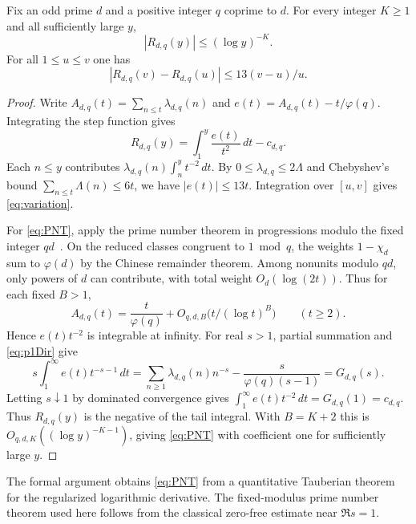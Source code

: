 \begin{lemma}\label{lem:pnt}
Fix an odd prime $d$ and a positive integer $q$ coprime to $d$.
For every integer $K\ge1$ and all sufficiently large $y$,
\begin{equation}
 |R_{d,q}(y)|\le (\log y)^{-K}.\label{eq:PNT}
\end{equation}
For all $1\le u\le v$ one has
\begin{equation}
 |R_{d,q}(v)-R_{d,q}(u)|\le 13(v-u)/u.\label{eq:variation}
\end{equation}
\end{lemma}
\begin{proof}
Write $A_{d,q}(t)=\sum_{n\le t}\lambda_{d,q}(n)$ and $e(t)=A_{d,q}(t)-t/\varphi(q)$.
Integrating the step function gives
\begin{equation}
 R_{d,q}(y)=\int_1^y\frac{e(t)}{t^2}\,dt-c_{d,q}.\label{eq:integralR}
\end{equation}
Each \(n\le y\) contributes \(\lambda_{d,q}(n)\int_n^y t^{-2}\,dt\).
By \(0\le\lambda_{d,q}\le2\Lambda\) and Chebyshev's bound
\(\sum_{n\le t}\Lambda(n)\le6t\), we have \(|e(t)|\le13t\).
Integration over \([u,v]\) gives \eqref{eq:variation}.

For \eqref{eq:PNT}, apply the prime number theorem in progressions modulo
the fixed integer \(qd\)~\cite[Corollary~11.19]{MV}. On the reduced classes congruent to \(1\bmod q\),
the weights \(1-\chi_d\) sum to \(\varphi(d)\) by the Chinese remainder
theorem. Among nonunits modulo \(qd\), only powers of \(d\) can contribute,
with total weight \(O_d(\log(2t))\). Thus for each fixed \(B>1\),
\[
 A_{d,q}(t)=\frac{t}{\varphi(q)}+O_{q,d,B}\big(t/(\log t)^B\big)\qquad(t\ge2).
\]
Hence \(e(t)t^{-2}\) is integrable at infinity. For real \(s>1\), partial
summation and \eqref{eq:p1Dir} give
\[
 s\int_1^\infty e(t)t^{-s-1}\,dt
 =\sum_{n\ge1}\lambda_{d,q}(n)n^{-s}-\frac{s}{\varphi(q)(s-1)}
 =G_{d,q}(s).
\]
Letting \(s\downarrow1\) by dominated convergence gives
\(\int_1^\infty e(t)t^{-2}\,dt=G_{d,q}(1)=c_{d,q}\). Thus \(R_{d,q}(y)\)
is the negative of the tail integral. With \(B=K+2\) this is
\(O_{q,d,K}((\log y)^{-K-1})\), giving \eqref{eq:PNT} with coefficient one
for sufficiently large \(y\).
\end{proof}
The formal argument obtains \eqref{eq:PNT} from a quantitative Tauberian
theorem for the regularized logarithmic derivative. The fixed-modulus
prime number theorem used here follows from the classical zero-free estimate
near \(\Re s=1\).

